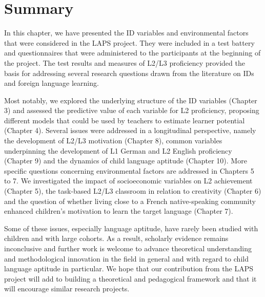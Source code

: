 \documentclass[output=paper]{langscibook}
\begin{document}
\section{Summary}

In this chapter, we have presented the ID variables and environmental factors that were considered in the LAPS project. They were included in a test battery and questionnaires that were administered to the participants at the beginning of the project. The test results and measures of L2/L3 proficiency provided the basis for addressing several research questions drawn from the literature on IDs and foreign language learning. 
\begin{sloppypar}
Most notably, we explored the underlying structure of the ID variables (Chapter 3) and assessed the predictive value of each variable for L2 proficiency, proposing different models that could be used by teachers to estimate learner potential (Chapter 4). Several issues were addressed in a longitudinal perspective, namely the development of L2/L3 motivation (Chapter 8), common variables underpinning the development of L1 German and L2 English proficiency (Chapter 9) and the dynamics of child language aptitude (Chapter 10). More specific questions concerning environmental factors are addressed in Chapters 5 to 7. We investigated the impact of socioeconomic variables on L2 achievement (Chapter 5), the task-based L2/L3 classroom in relation to creativity (Chapter 6) and the question of whether living close to a French native-speaking community enhanced children’s motivation to learn the target language (Chapter 7).
\end{sloppypar}

Some of these issues, especially language aptitude, have rarely been studied with children and with large cohorts. As a result, scholarly evidence remains inconclusive and further work is welcome to advance theoretical understanding and methodological innovation in the field in general and with regard to child language aptitude in particular. We hope that our contribution from the LAPS project will add to building a theoretical and pedagogical framework and that it will encourage similar research projects. 

{\sloppy\printbibliography[heading=subbibliography,notkeyword=this]}
\end{document}
